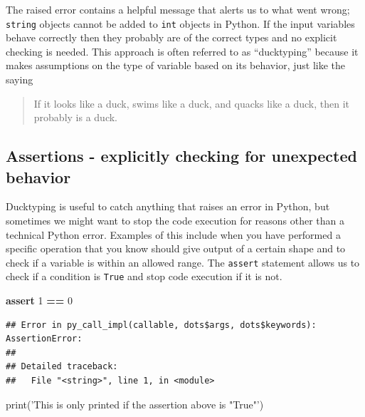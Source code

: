 \documentclass[]{Nemilov}
\newenvironment{Shaded}{\begin{snugshade}}{\end{snugshade}}
\newcommand{\BuiltInTok}[1]{#1}
\newcommand{\ControlFlowTok}[1]{\textcolor[rgb]{0.13,0.29,0.53}{\textbf{#1}}}
\newcommand{\DecValTok}[1]{\textcolor[rgb]{0.00,0.00,0.81}{#1}}
\newcommand{\NormalTok}[1]{#1}
\newcommand{\OperatorTok}[1]{\textcolor[rgb]{0.81,0.36,0.00}{\textbf{#1}}}
\newcommand{\StringTok}[1]{\textcolor[rgb]{0.31,0.60,0.02}{#1}}
\begin{document}
The raised error contains a helpful message that alerts us to what went wrong;
\texttt{string} objects cannot be added to \texttt{int} objects in Python. If the input
variables behave correctly then they probably are of the correct types and no
explicit checking is needed. This approach is often referred to as ``ducktyping''
because it makes assumptions on the type of variable based on its behavior, just
like the saying

\begin{quote}
If it looks like a duck, swims like a duck, and quacks like a duck, then it
probably is a duck.
\end{quote}

\hypertarget{py-dev-assertions-explicitly-checking-for-unexpected-behavior}{%
\subsection{Assertions - explicitly checking for unexpected behavior}\label{py-dev-assertions-explicitly-checking-for-unexpected-behavior}}

Ducktyping is useful to catch anything that raises an error in Python, but
sometimes we might want to stop the code execution for reasons other than a
technical Python error. Examples of this include when you have performed a
specific operation that you know should give output of a certain shape and to
check if a variable is within an allowed range. The \texttt{assert} statement allows
us to check if a condition is \texttt{True} and stop code execution if it is not.

\begin{Shaded}
\begin{Highlighting}[]
\ControlFlowTok{assert} \DecValTok{1} \OperatorTok{==} \DecValTok{0}
\end{Highlighting}
\end{Shaded}

\begin{verbatim}
## Error in py_call_impl(callable, dots$args, dots$keywords): AssertionError: 
## 
## Detailed traceback: 
##   File "<string>", line 1, in <module>
\end{verbatim}

\begin{Shaded}
\begin{Highlighting}[]
\BuiltInTok{print}\NormalTok{(}\StringTok{'This is only printed if the assertion above is "True"'}\NormalTok{)}
\end{Highlighting}
\end{Shaded}
\end{document}

